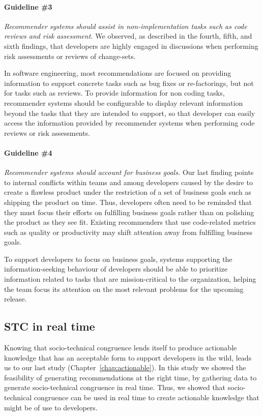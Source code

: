 \paragraph{Guideline \#3} \emph{Recommender systems should assist in non-implementation tasks such as code reviews and risk assessment.} 
We observed, as described in the fourth, fifth, and sixth findings, that developers are highly engaged in discussions when performing risk assessments or reviews of change-sets. 

In software engineering, most recommendations are focused on providing information to support concrete tasks such as bug fixes or re-factorings, but not for tasks such as reviews. To provide information for non coding tasks, recommender systems should be configurable to display relevant information beyond the tasks that they are intended to support, so that developer can easily access the information provided by recommender systems when performing code reviews or risk assessments.

\paragraph{Guideline \#4} \emph{Recommender systems should account for business goals.}
Our last finding points to internal conflicts within teams and among developers caused by the desire to create a flawless product under the restriction of a set of business goals such as shipping the product on time.
Thus, developers often need to be reminded that they must focus their efforts on fulfilling business goals rather than on polishing the product as they see fit. Existing recommenders that use code-related metrics such as quality or productivity may shift attention away from fulfilling business goals.

To support developers to focus on business goals, systems supporting the information-seeking behaviour of developers should be able to prioritize information related to tasks that are mission-critical to the organization, helping the team focus its attention on the most relevant problems for the upcoming release.


\subsection{STC in real time}
Knowing that socio-technical congruence lends itself to produce actionable knowledge that has an acceptable form to support developers in the wild, leads us to our last study (Chapter~\ref{chap:actionable}).
In this study we showed the feasibility of generating recommendations at the right time, by gathering data to generate socio-technical congruence in real time.
Thus, we showed that socio-technical congruence can be used in real time to create actionable knowledge that might be of use to developers.


